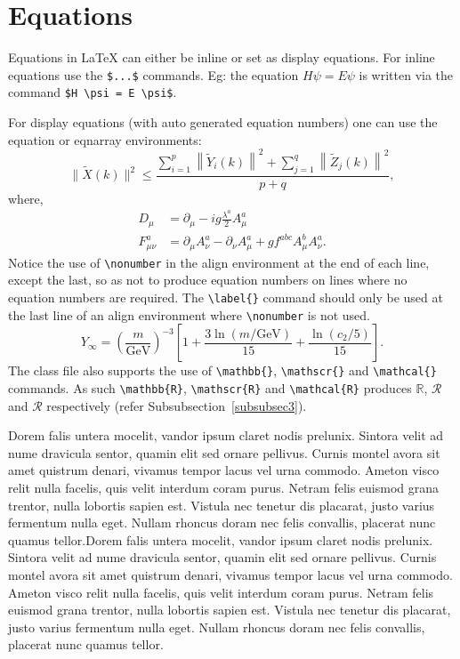 \documentclass[namedate,webpdf,contemporary,large]{TBench-template}%
\theoremstyle{thmstyleone}%
\theoremstyle{thmstyletwo}%
\theoremstyle{thmstylethree}%
\begin{document}
\section{Equations}\label{sec4}

Equations in \LaTeX{} can either be inline or set as display equations. For
inline equations use the \verb+$...$+ commands. Eg: the equation
$H\psi = E \psi$ is written via the command \verb+$H \psi = E \psi$+.

For display equations (with auto generated equation numbers)
one can use the equation or eqnarray environments:
\begin{equation}
\|\tilde{X}(k)\|^2 \leq\frac{\sum\limits_{i=1}^{p}\left\|\tilde{Y}_i(k)\right\|^2+\sum\limits_{j=1}^{q}\left\|\tilde{Z}_j(k)\right\|^2 }{p+q},\label{eq1}
\end{equation}
where,
\begin{align}
D_\mu &=  \partial_\mu - ig \frac{\lambda^a}{2} A^a_\mu \nonumber \\
F^a_{\mu\nu} &= \partial_\mu A^a_\nu - \partial_\nu A^a_\mu + g f^{abc} A^b_\mu A^a_\nu.\label{eq2}
\end{align}
Notice the use of \verb+\nonumber+ in the align environment at the end
of each line, except the last, so as not to produce equation numbers on
lines where no equation numbers are required. The \verb+\label{}+ command
should only be used at the last line of an align environment where
\verb+\nonumber+ is not used.
\begin{equation}
Y_\infty = \left( \frac{m}{\textrm{GeV}} \right)^{-3}
    \left[ 1 + \frac{3 \ln(m/\textrm{GeV})}{15}
    + \frac{\ln(c_2/5)}{15} \right].
\end{equation}
The class file also supports the use of \verb+\mathbb{}+, \verb+\mathscr{}+ and
\verb+\mathcal{}+ commands. As such \verb+\mathbb{R}+, \verb+\mathscr{R}+
and \verb+\mathcal{R}+ produces $\mathbb{R}$, $\mathscr{R}$ and $\mathcal{R}$
respectively (refer Subsubsection~\ref{subsubsec3}).


Dorem falis untera mocelit, vandor ipsum claret nodis prelunix. Sintora velit ad nume dravicula sentor, quamin elit sed ornare pellivus. Curnis montel avora sit amet quistrum denari, vivamus tempor lacus vel urna commodo. Ameton visco relit nulla facelis, quis velit interdum coram purus. Netram felis euismod grana trentor, nulla lobortis sapien est. Vistula nec tenetur dis placarat, justo varius fermentum nulla eget. Nullam rhoncus doram nec felis convallis, placerat nunc quamus tellor.Dorem falis untera mocelit, vandor ipsum claret nodis prelunix. Sintora velit ad nume dravicula sentor, quamin elit sed ornare pellivus. Curnis montel avora sit amet quistrum denari, vivamus tempor lacus vel urna commodo. Ameton visco relit nulla facelis, quis velit interdum coram purus. Netram felis euismod grana trentor, nulla lobortis sapien est. Vistula nec tenetur dis placarat, justo varius fermentum nulla eget. Nullam rhoncus doram nec felis convallis, placerat nunc quamus tellor.
\end{document}
